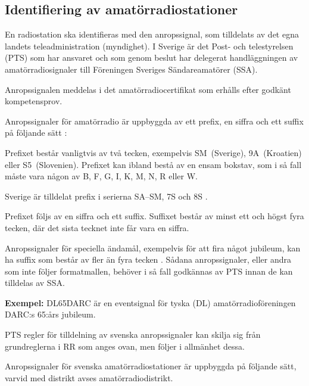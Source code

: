 \subsection{Identifiering av amatörradiostationer}

En radiostation ska identifieras med den anropssignal, som tilldelats av det
egna landets teleadministration (myndighet).
I Sverige är det Post- och telestyrelsen (PTS) som har ansvaret och som genom
beslut har delegerat handläggningen av amatörradiosignaler till Föreningen
Sveriges Sändareamatörer (SSA).

Anropssignalen meddelas i det amatörradiocertifikat som erhålls efter godkänt
kompetensprov.

Anropssignaler för amatörradio är uppbyggda av ett prefix, en siffra och ett
suffix på följande sätt \cite[\S19.68, \S19.69]{ITU-RR}:

Prefixet består vanligtvis av två tecken, exempelvis SM~(Sverige), 9A~(Kroatien)
eller S5~(Slovenien).
Prefixet kan ibland bestå av en ensam bokstav, som i så fall måste vara någon
av B, F, G, I, K, M, N, R eller W.

Sverige är tilldelat prefix i serierna SA--SM, 7S och 8S
\cite[Appendix 42]{ITU-RR}.

Prefixet följs av en siffra och ett suffix. Suffixet består av minst ett och
högst fyra tecken, där det sista tecknet inte får vara en siffra.

Anropssignaler för speciella ändamål, exempelvis för att fira något jubileum,
kan ha suffix som består av fler än fyra tecken \cite[\S19.68A]{ITU-RR}.
Sådana anropssignaler, eller andra som inte följer formatmallen, behöver i så
fall godkännas av PTS innan de kan tilldelas av SSA.

\textbf{Exempel:} DL65DARC är en eventsignal för tyska (DL)
amatörradioföreningen DARC:s 65:års jubileum.

PTS regler för tilldelning av svenska anropssignaler kan skilja sig från
grundreglerna i RR som anges ovan, men följer i allmänhet dessa.

Anropssignaler för svenska amatörradiostationer är uppbyggda på följande
sätt, varvid med distrikt avses amatörradiodistrikt.

